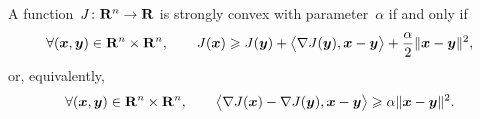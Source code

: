 \begin{proposition}
    A function~$J\colon \mathbf R^n \to \mathbf R$ is strongly convex with parameter~$\alpha$ if and only if
    \begin{equation}
        \label{eq:strong_convex_eq1}
        \forall (\vect x, \vect y) \in \real^n \times \real^n,
        \qquad J(\vect x) \geq J(\vect y) + \ip[\big]{\nabla J(\vect y), \vect x - \vect y} + \frac{\alpha}{2} \norm{\vect x - \vect y}^2,
    \end{equation}
    or, equivalently,
    \begin{equation}
        \label{eq:strong_convex_eq2}
        \forall (\vect x, \vect y) \in \real^n \times \real^n,
        \qquad \ip[\big]{\nabla J(\vect x) - \nabla J(\vect y), \vect x - \vect y}
        \geq \alpha \norm{\vect x - \vect y}^2.
    \end{equation}
\end{proposition}
